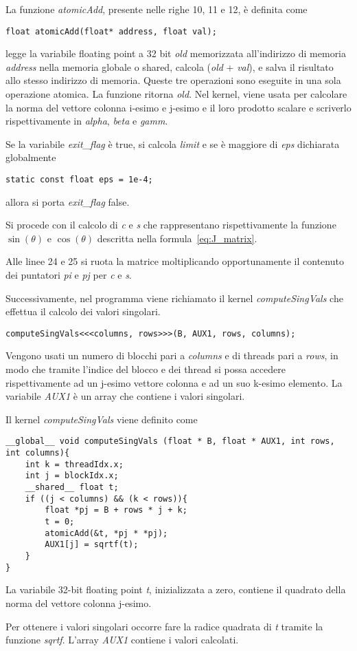 La funzione \textit{atomicAdd}, presente nelle righe 10, 11 e 12, è definita come
\begin{lstlisting}
float atomicAdd(float* address, float val);
\end{lstlisting}
legge la variabile floating point a 32 bit \textit{old} memorizzata all'indirizzo di memoria \textit{address} nella memoria globale o shared, calcola (\textit{old} + \textit{val}), e salva il risultato allo stesso indirizzo di memoria. Queste tre operazioni sono eseguite in una sola operazione atomica. La funzione ritorna \textit{old}. Nel kernel, viene usata per calcolare la norma del vettore colonna i-esimo e j-esimo e il loro prodotto scalare e scriverlo rispettivamente in \textit{alpha}, \textit{beta} e \textit{gamm}.

Se la variabile \textit{exit\_flag} è true, si calcola \textit{limit} e se è maggiore di \textit{eps} dichiarata globalmente
\begin{lstlisting}[caption=Dichiarazione della variabile \textit{eps},label=code:eps]
static const float eps = 1e-4;
\end{lstlisting}
allora si porta \textit{exit\_flag} false.

Si procede con il calcolo di \textit{c} e \textit{s} che rappresentano rispettivamente la funzione $\sin(\theta)$ e $\cos(\theta)$ descritta nella formula~\eqref{eq:J_matrix}.

Alle linee 24 e 25 si ruota la matrice moltiplicando opportunamente il contenuto dei puntatori \textit{pi} e \textit{pj} per \textit{c} e \textit{s}.

Successivamente, nel programma viene richiamato il kernel \textit{computeSingVals} che effettua il calcolo dei valori singolari. 
\begin{lstlisting}
computeSingVals<<<columns, rows>>>(B, AUX1, rows, columns);
\end{lstlisting}
Vengono usati un numero di blocchi pari a \textit{columns} e di threads pari a \textit{rows}, in modo che tramite l'indice del blocco e dei thread si possa accedere rispettivamente ad un j-esimo vettore colonna e ad un suo k-esimo elemento. La variabile \textit{AUX1} è un array che contiene i valori singolari.

Il kernel \textit{computeSingVals} viene definito come
\begin{lstlisting}[caption=Kernel per il calcolo dei valori singolari,label=code:computeSingVals]
__global__ void computeSingVals (float * B, float * AUX1, int rows, int columns){
	int k = threadIdx.x;
	int j = blockIdx.x;
	__shared__ float t;
	if ((j < columns) && (k < rows)){
		float *pj = B + rows * j + k;
		t = 0;
		atomicAdd(&t, *pj * *pj);
		AUX1[j] = sqrtf(t);
	}
}
\end{lstlisting}
La variabile 32-bit floating point \textit{t}, inizializzata a zero, contiene il quadrato della norma del vettore colonna j-esimo. 

Per ottenere i valori singolari occorre fare la radice quadrata di \textit{t} tramite la funzione \textit{sqrtf}. L'array \textit{AUX1} contiene i valori calcolati.